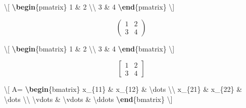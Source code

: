 \documentclass[
  10pt,
]{scrbook}
\newenvironment{Shaded}{}{}
\newcommand{\ExtensionTok}[1]{#1}
\newcommand{\KeywordTok}[1]{\textcolor[rgb]{0.00,0.44,0.13}{\textbf{#1}}}
\newcommand{\NormalTok}[1]{#1}
\newcommand{\SpecialCharTok}[1]{\textcolor[rgb]{0.25,0.44,0.63}{#1}}
\newcommand{\SpecialStringTok}[1]{\textcolor[rgb]{0.73,0.40,0.53}{#1}}
\theoremstyle{definition}
\theoremstyle{definition}
\theoremstyle{definition}
\theoremstyle{definition}
\theoremstyle{remark}
\begin{document}
\begin{Shaded}
\begin{Highlighting}[]
\SpecialStringTok{\textbackslash{}[}
\KeywordTok{\textbackslash{}begin}\NormalTok{\{}\ExtensionTok{pmatrix}\NormalTok{\}}
\SpecialStringTok{1 \& 2 }\SpecialCharTok{\textbackslash{}\textbackslash{}}
\SpecialStringTok{3 \& 4}
\KeywordTok{\textbackslash{}end}\NormalTok{\{}\ExtensionTok{pmatrix}\NormalTok{\}}
\SpecialStringTok{\textbackslash{}]}
\end{Highlighting}
\end{Shaded}

\[
\begin{pmatrix}
1 & 2 \\
3 & 4
\end{pmatrix}
\]

\begin{Shaded}
\begin{Highlighting}[]
\SpecialStringTok{\textbackslash{}[}
\KeywordTok{\textbackslash{}begin}\NormalTok{\{}\ExtensionTok{bmatrix}\NormalTok{\}}
\SpecialStringTok{1 \& 2 }\SpecialCharTok{\textbackslash{}\textbackslash{}}
\SpecialStringTok{3 \& 4}
\KeywordTok{\textbackslash{}end}\NormalTok{\{}\ExtensionTok{bmatrix}\NormalTok{\}}
\SpecialStringTok{\textbackslash{}]}
\end{Highlighting}
\end{Shaded}

\[
\begin{bmatrix}
1 & 2 \\
3 & 4
\end{bmatrix}
\]

\begin{Shaded}
\begin{Highlighting}[]
\SpecialStringTok{\textbackslash{}[}
\SpecialStringTok{A=}
\KeywordTok{\textbackslash{}begin}\NormalTok{\{}\ExtensionTok{bmatrix}\NormalTok{\}}
\SpecialStringTok{x\_\{11\} \& x\_\{12\} \& }\SpecialCharTok{\textbackslash{}dots}\SpecialStringTok{ }\SpecialCharTok{\textbackslash{}\textbackslash{}}
\SpecialStringTok{x\_\{21\} \& x\_\{22\} \& }\SpecialCharTok{\textbackslash{}dots}\SpecialStringTok{ }\SpecialCharTok{\textbackslash{}\textbackslash{}}
\SpecialCharTok{\textbackslash{}vdots}\SpecialStringTok{ \& }\SpecialCharTok{\textbackslash{}vdots}\SpecialStringTok{ \& }\SpecialCharTok{\textbackslash{}ddots}
\KeywordTok{\textbackslash{}end}\NormalTok{\{}\ExtensionTok{bmatrix}\NormalTok{\}}
\SpecialStringTok{\textbackslash{}]}
\end{Highlighting}
\end{Shaded}
\end{document}
